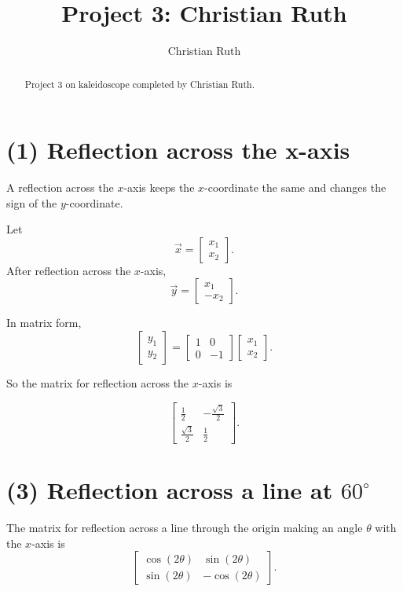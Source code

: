 \documentclass{ximera}
\title{Project 3: Christian Ruth}
\author{Christian Ruth}
\begin{document}
\begin{abstract}
    Project 3 on kaleidoscope completed by Christian Ruth.
\end{abstract}

\maketitle

\section*{(1) Reflection across the x-axis}

A reflection across the $x$-axis keeps the $x$-coordinate the same and changes the sign of the $y$-coordinate.

Let
\[
\vec{x}=\begin{bmatrix}x_1\\x_2\end{bmatrix}.
\]
After reflection across the $x$-axis,
\[
\vec{y}=\begin{bmatrix}x_1\\-x_2\end{bmatrix}.
\]

In matrix form,
\[
\begin{bmatrix}
    y_1\\
    y_2
\end{bmatrix}
=
\begin{bmatrix}
    1 & 0\\
    0 & -1
\end{bmatrix}
\begin{bmatrix}
    x_1\\
    x_2
\end{bmatrix}.
\]

So the matrix for reflection across the $x$-axis is

\[
\begin{bmatrix}
\frac{1}{2} & -\frac{\sqrt{3}}{2}\\
\frac{\sqrt{3}}{2} & \frac{1}{2}
\end{bmatrix}.
\]

\section*{(3) Reflection across a line at $60^\circ$}

The matrix for reflection across a line through the origin making an angle $\theta$ with the $x$-axis is
\[
\begin{bmatrix}
\cos(2\theta) & \sin(2\theta)\\
\sin(2\theta) & -\cos(2\theta)
\end{bmatrix}.
\]
\end{document}

